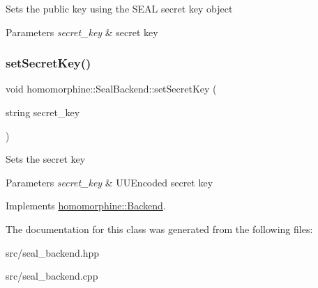 Sets the public key using the S\+E\+AL secret key object


\begin{DoxyParams}{Parameters}
{\em secret\+\_\+key} & secret key \\
\hline
\end{DoxyParams}
\mbox{\label{classhomomorphine_1_1_seal_backend_aa9fd3331b2c710e8fdfc3385bbf11eb5}} 
\subsubsection{\texorpdfstring{setSecretKey()}{setSecretKey()}}
{\footnotesize\ttfamily void homomorphine\+::\+Seal\+Backend\+::set\+Secret\+Key (\begin{DoxyParamCaption}\item[{string}]{secret\+\_\+key }\end{DoxyParamCaption})\hspace{0.3cm}{\ttfamily [virtual]}}

Sets the secret key


\begin{DoxyParams}{Parameters}
{\em secret\+\_\+key} & U\+U\+Encoded secret key \\
\hline
\end{DoxyParams}


Implements \mbox{\hyperlink{classhomomorphine_1_1_backend_af20abcf14fae6a93c02e6470ea111123}{homomorphine\+::\+Backend}}.



The documentation for this class was generated from the following files\+:\begin{DoxyCompactItemize}
\item 
src/seal\+\_\+backend.\+hpp\item 
src/seal\+\_\+backend.\+cpp\end{DoxyCompactItemize}
